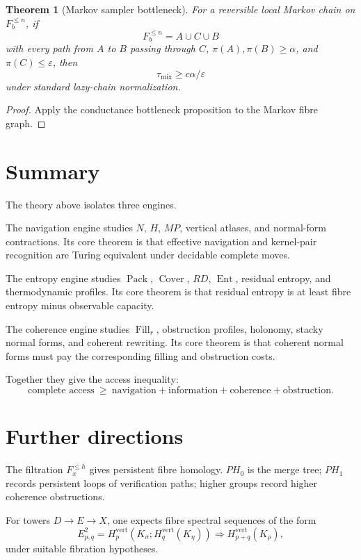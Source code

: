 \documentclass[11pt]{article}
\newtheorem{theorem}{Theorem}[section]
\DeclareMathOperator{\Ent}{Ent}
\DeclareMathOperator{\Fill}{Fill}
\DeclareMathOperator{\Pack}{Pack}
\DeclareMathOperator{\Cover}{Cover}
\begin{document}
\begin{theorem}[Markov sampler bottleneck]
For a reversible local Markov chain on \(F_b^{\le n}\), if
\[
F_b^{\le n}=A\cup C\cup B
\]
with every path from \(A\) to \(B\) passing through \(C\), \(\pi(A),\pi(B)\ge\alpha\), and \(\pi(C)\le\varepsilon\), then
\[
\tau_{\mathrm{mix}}\ge c\alpha/\varepsilon
\]
under standard lazy-chain normalization.
\end{theorem}

\begin{proof}
Apply the conductance bottleneck proposition to the Markov fibre graph.
\end{proof}

\section{Summary}

The theory above isolates three engines.

The navigation engine studies \(N\), \(H\), \(MP\), vertical atlases, and normal-form contractions.  Its core theorem is that effective navigation and kernel-pair recognition are Turing equivalent under decidable complete moves.

The entropy engine studies \(\Pack\), \(\Cover\), \(RD\), \(\Ent\), residual entropy, and thermodynamic profiles.  Its core theorem is that residual entropy is at least fibre entropy minus observable capacity.

The coherence engine studies \(\Fill_r\), obstruction profiles, holonomy, stacky normal forms, and coherent rewriting.  Its core theorem is that coherent normal forms must pay the corresponding filling and obstruction costs.

Together they give the access inequality:
\[
\text{complete access}\ \ge\
\text{navigation}+\text{information}+\text{coherence}+\text{obstruction}.
\]

\section{Further directions}

The filtration \(F_x^{\le h}\) gives persistent fibre homology.  \(PH_0\) is the merge tree; \(PH_1\) records persistent loops of verification paths; higher groups record higher coherence obstructions.

For towers \(D\to E\to X\), one expects fibre spectral sequences of the form
\[
E^2_{p,q}=H_p^{\mathrm{vert}}(K_\sigma;H_q^{\mathrm{vert}}(K_\eta))
\Rightarrow H_{p+q}^{\mathrm{vert}}(K_\rho),
\]
under suitable fibration hypotheses.
\end{document}
